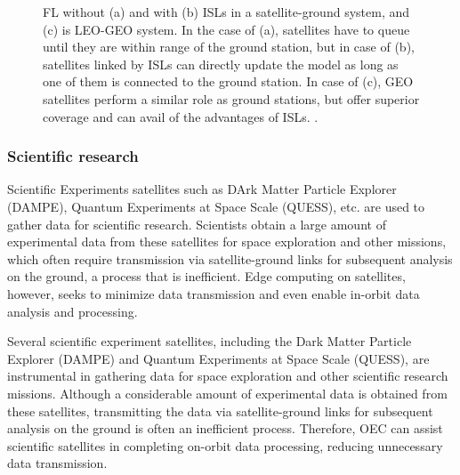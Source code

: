 \documentclass[lettersize,journal]{IEEEtran}
\begin{document}
\begin{figure*}[h!]
  \centering
  
    

    \centering
    \caption{FL without (a) and with (b) ISLs in a satellite-ground system, and (c) is LEO-GEO system. In the case of (a), satellites have to queue until they are within range of the ground station, but in case of (b), satellites linked by ISLs can directly update the model as long as one of them is connected to the ground station. In case of (c), GEO satellites perform a similar role as ground stations, but offer superior coverage and can avail of the advantages of ISLs. \cite{RN217}. }
    \label{fig6}
  \end{figure*}
  

\subsubsection*{Scientific research} Scientific Experiments satellites such as DArk Matter Particle Explorer (DAMPE), Quantum Experiments at Space Scale (QUESS), etc. are used to gather data for scientific research. Scientists obtain a large amount of experimental data from these satellites for space exploration and other missions, which often require transmission via satellite-ground links for subsequent analysis on the ground, a process that is inefficient. Edge computing on satellites, however, seeks to minimize data transmission and even enable in-orbit data analysis and processing.

Several scientific experiment satellites, including the Dark Matter Particle Explorer (DAMPE) and Quantum Experiments at Space Scale (QUESS), are instrumental in gathering data for space exploration and other scientific research missions. Although a considerable amount of experimental data is obtained from these satellites, transmitting the data via satellite-ground links for subsequent analysis on the ground is often an inefficient process. Therefore, OEC can assist scientific satellites in completing on-orbit data processing, reducing unnecessary data transmission.
\end{document}

